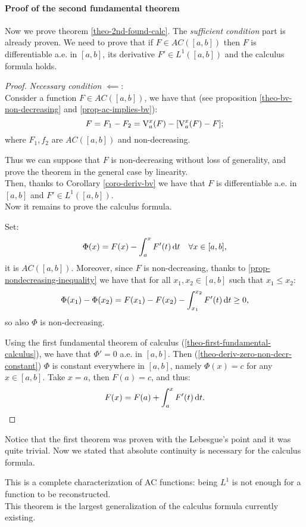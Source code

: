 \paragraph{Proof of the second fundamental theorem} Now we prove theorem \vref{theo-2nd-found-calc}. The \textit{sufficient condition} part is already proven. We need to prove that if $F \in AC([a,b])$ then $F$ is differentiable a.e. in $[a,b]$, its derivative $F' \in L^1([a,b])$ and the calculus formula holds.
\begin{proof}
	\textit{Necessary condition} $\impliedby$:\\
	Consider a function $F \in AC([a,b])$, we have that (see proposition \vref{theo-bv-non-decreasing} and \vref{prop-ac-implies-bv}):
	$$F=F_1 - F_2 = \operatorname{V}_a^x (F) - [\operatorname{V}_a^x(F)-F];$$
	where $F_1, f_2$ are $AC([a,b])$ and non-decreasing.
	
	Thus we can suppose that $F$ is non-decreasing without loss of generality, and prove the theorem in the general case by linearity.\\
	Then, thanks to Corollary \vref{coro-deriv-bv} we have that $F$ is differentiable a.e. in $[a,b]$ and $F' \in L^1([a,b])$.\\
	Now it remains to prove the calculus formula. 
	
	Set:
	$$\Phi(x) = F(x)-\int_a^x F'(t) \,\mathrm d t \quad \forall x \in [a,b],$$
	it is $AC([a,b])$. Moreover, since $F$ is non-decreasing, thanks to \vref{prop-nondecreasing-inequality} we have that for all $x_1, x_2 \in [a,b]$ such that $x_1 \leq x_2$:
	$$\Phi(x_1)-\Phi(x_2) = F(x_1)-F(x_2) - \int_{x_1}^{x_2}F'(t) \, \mathrm d t \geq 0,$$
	so also $\Phi$ is non-decreasing.
	
	Using the first fundamental theorem of calculus (\vref{theo-first-fundamental-calculus}), we have that $\Phi'=0$ a.e. in $[a,b]$. Then (\vref{theo-deriv-zero-non-decr-constant}) $\Phi$ is constant everywhere in $[a,b]$, namely $\Phi(x)=c$ for any $x\in [a,b]$. Take $x = a$, then $F(a) = c$, and thus:
	$$F(x)=F(a) + \int_a^x F'(t) \,\mathrm d t.$$
\end{proof}

Notice that the first theorem was proven with the Lebesgue's point and it was quite trivial. Now we stated that absolute continuity is necessary for the calculus formula.

This is a complete characterization of AC functions: being $L^1$ is not enough for a function to be reconstructed.\\
This theorem is the largest generalization of the calculus formula currently existing.
